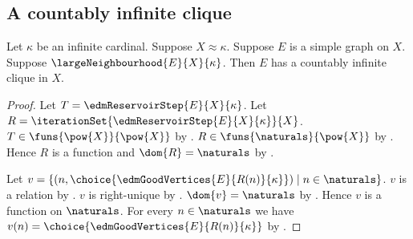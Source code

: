 \subsection{A countably infinite clique}

\begin{theorem}\label{large_neighbourhood_gives_clique}
    Let $\kappa$ be an infinite cardinal.
    Suppose $X\approx\kappa$.
    Suppose $E$ is a simple graph on $X$.
    Suppose $\largeNeighbourhood{E}{X}{\kappa}$.
    Then $E$ has a countably infinite clique in $X$.
\end{theorem}
\begin{proof}
    Let $T=\edmReservoirStep{E}{X}{\kappa}$.
    Let $R=\iterationSet{\edmReservoirStep{E}{X}{\kappa}}{X}$.
    $T\in\funs{\pow{X}}{\pow{X}}$ by
        .
    $R\in\funs{\naturals}{\pow{X}}$ by
        .
    Hence $R$ is a function and $\dom{R}=\naturals$ by
        .

    Let $v=\{(n,\choice{\edmGoodVertices{E}{R(n)}{\kappa}})
        \mid n\in\naturals\}$.
    $v$ is a relation by .
    $v$ is right-unique by .
    $\dom{v}=\naturals$ by .
    Hence $v$ is a function on $\naturals$.
    For every $n\in\naturals$ we have
        $v(n)=\choice{\edmGoodVertices{E}{R(n)}{\kappa}}$ by
        .


\end{proof}
